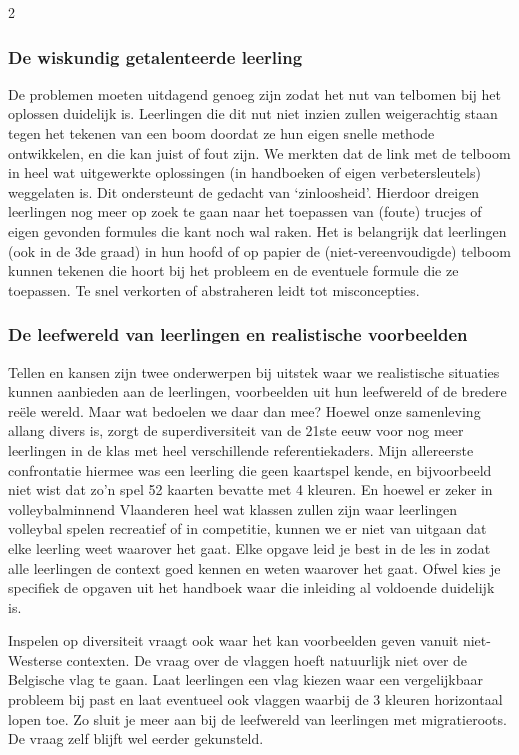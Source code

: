 \begin{multicols}{2} %


\subsubsection{De wiskundig getalenteerde leerling}
De problemen moeten uitdagend genoeg zijn zodat het nut van telbomen bij het oplossen duidelijk is. Leerlingen die dit nut niet inzien zullen weigerachtig staan tegen het tekenen van een boom doordat ze hun eigen snelle methode ontwikkelen, en die kan juist of fout zijn. We merkten dat de link met de telboom in heel wat uitgewerkte oplossingen (in handboeken of eigen verbetersleutels) weggelaten is. Dit ondersteunt de gedacht van ‘zinloosheid’. Hierdoor dreigen leerlingen nog meer op zoek te gaan naar het toepassen van (foute) trucjes of eigen gevonden formules die kant noch wal raken. Het is belangrijk dat leerlingen (ook in de 3de graad) in hun hoofd of op papier de (niet-vereenvoudigde) telboom kunnen tekenen die hoort bij het probleem en de eventuele formule die ze toepassen. Te snel verkorten of abstraheren leidt tot misconcepties. 
\subsubsection{De leefwereld van leerlingen en realistische voorbeelden}
Tellen en kansen zijn twee onderwerpen bij uitstek waar we realistische situaties kunnen aanbieden aan de leerlingen, voorbeelden uit hun leefwereld of de bredere reële wereld. Maar wat bedoelen we daar dan mee? Hoewel onze samenleving allang divers is, zorgt de superdiversiteit van de 21ste eeuw voor nog meer leerlingen in de klas met heel verschillende referentiekaders. Mijn allereerste confrontatie hiermee was een leerling die geen kaartspel kende, en bijvoorbeeld niet wist dat zo’n spel 52 kaarten bevatte met 4 kleuren. En hoewel er zeker in volleybalminnend Vlaanderen heel wat klassen zullen zijn waar leerlingen volleybal spelen recreatief of in competitie, kunnen we er niet van uitgaan dat elke leerling weet waarover het gaat. Elke opgave leid je best in de les in zodat alle leerlingen de context goed kennen en weten waarover het gaat. Ofwel kies je specifiek de opgaven uit het handboek waar die inleiding al voldoende duidelijk is. 

Inspelen op diversiteit vraagt ook waar het kan voorbeelden geven vanuit niet-Westerse contexten. De vraag over de vlaggen hoeft natuurlijk niet over de Belgische vlag te gaan. Laat leerlingen een vlag kiezen waar een vergelijkbaar probleem bij past en laat eventueel ook vlaggen waarbij de 3 kleuren horizontaal lopen toe. Zo sluit je meer aan bij de leefwereld van leerlingen met migratieroots. De vraag zelf blijft wel eerder gekunsteld.


\end{multicols}
